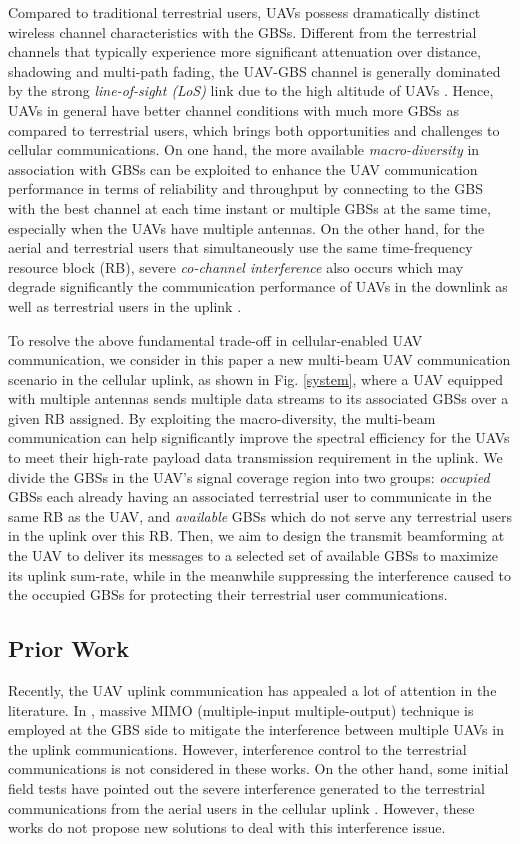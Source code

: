 \documentclass[onecolumn, draftclsnofoot, 12pt]{IEEEtran}
\begin{document}
Compared to traditional terrestrial users, UAVs possess dramatically distinct wireless channel characteristics with the GBSs. Different from the terrestrial channels that typically experience more significant attenuation over distance, shadowing and multi-path fading, the UAV-GBS channel is generally dominated by the strong \emph{line-of-sight (LoS)} link due to the high altitude of UAVs \cite{Qualcomm}. Hence, UAVs in general have better channel conditions with much more GBSs as compared to terrestrial users, which brings both opportunities and challenges to cellular communications. On one hand, the more available \emph{macro-diversity} in association with GBSs can be exploited to enhance the UAV communication performance in terms of reliability and throughput by connecting to the GBS with the best channel at each time instant \cite{Zhang18} or multiple GBSs at the same time, especially when the UAVs have multiple antennas. On the other hand, for the aerial and terrestrial users that simultaneously use the same time-frequency resource block (RB), severe \emph{co-channel interference} also occurs which may degrade significantly the communication performance of UAVs in the downlink as well as terrestrial users in the uplink \cite{Azari17,Nguyen18}.

To resolve the above fundamental trade-off in cellular-enabled UAV communication, we consider in this paper a new multi-beam UAV communication scenario in the cellular uplink, as shown in Fig. \ref{system}, where a UAV equipped with multiple antennas sends multiple data streams to its associated GBSs over a given RB assigned. By exploiting the macro-diversity, the multi-beam communication can help significantly improve the spectral efficiency for the UAVs to meet their high-rate payload data transmission requirement in the uplink. We divide the GBSs in the UAV's signal coverage region into two groups: \emph{occupied} GBSs each already having an associated terrestrial user to communicate in the same RB as the UAV, and \emph{available} GBSs which do not serve any terrestrial users in the uplink over this RB. Then, we aim to design the transmit beamforming at the UAV to deliver its messages to a selected set of available GBSs to maximize its uplink sum-rate, while in the meanwhile suppressing the interference caused to the occupied GBSs for protecting their terrestrial user communications.



\subsection{Prior Work}
Recently, the UAV uplink communication has appealed a lot of attention in the literature. In \cite{Larsson18,Larsson}, massive MIMO (multiple-input multiple-output) technique is employed at the GBS side to mitigate the interference between multiple UAVs in the uplink communications. However, interference control to the terrestrial communications is not considered in these works. On the other hand, some initial field tests have pointed out the severe interference generated to the terrestrial communications from the aerial users in the cellular uplink \cite{Lin17,Lin18}. However, these works do not propose new solutions to deal with this interference issue.
\end{document}
